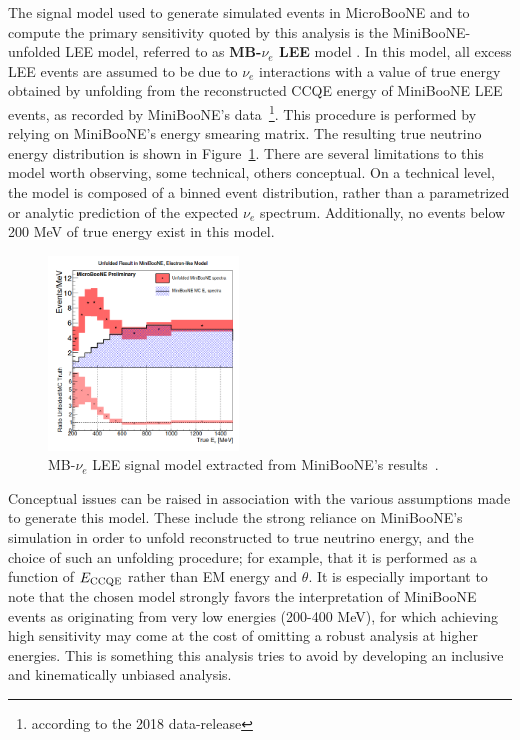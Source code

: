 \par  The signal model used to generate simulated events in MicroBooNE and to compute the primary sensitivity quoted by this analysis  is the MiniBooNE-unfolded LEE model, referred to as \textbf{MB-$\nu_e$ LEE} model \cite{C2,C}. In this model, all excess LEE events are assumed to be due to $\nu_e$ interactions with a value of true energy obtained by unfolding from the reconstructed CCQE energy of MiniBooNE LEE events, as recorded by MiniBooNE's data~\footnote{according to the 2018 data-release}. This procedure is performed by relying on MiniBooNE's energy smearing matrix. The resulting true neutrino energy distribution is shown in Figure~\ref{fig:minibooneunfolded}. There are several limitations to this model worth observing, some technical, others conceptual. On a technical level, the model is composed of a binned event distribution, rather than a parametrized or analytic prediction of the expected $\nu_e$ spectrum. Additionally, no events below 200 MeV of true energy exist in this model. 
\begin{figure}[ht]
\begin{center}
\includegraphics[width=0.45\textwidth]{introduction/unfoldedminiboone.png}
\caption{\label{fig:minibooneunfolded}MB-$\nu_e$ LEE signal model extracted from MiniBooNE's results~\cite{C2}.}
\end{center}
\end{figure}
Conceptual issues can be raised in association with the various assumptions made to generate this model. These include the strong reliance on MiniBooNE's simulation in order to unfold reconstructed to true neutrino energy, and the choice of such an unfolding procedure; for example, that it is performed as a function of $E_{\rm CCQE}$ rather than EM energy and $\theta$.
It is especially important to note that the chosen model strongly favors the interpretation of MiniBooNE events as originating from very low energies (200-400 MeV), for which achieving high sensitivity may come at the cost of omitting a robust analysis at higher energies. This is something this analysis tries to avoid by developing an inclusive and kinematically unbiased analysis. %
